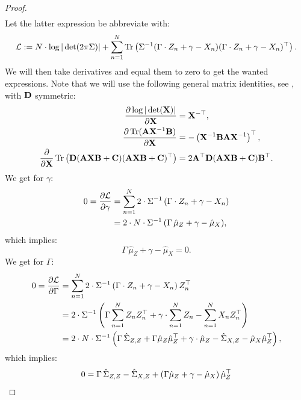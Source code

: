 \begin{Lem}
\begin{proof}
\begin{align*}
    \end{align*}
Let the latter expression be abbreviate with:
\[\mathcal{L}  :=N \cdot \log |\det(2\pi\Sigma)| + \sum_{n=1}^N \operatorname{Tr}\left ( \Sigma^{-1}(\Gamma \cdot Z_n + \gamma - X_n)(\Gamma \cdot Z_n + \gamma - X_n)^\top \right ).\]
    We will then take derivatives and equal them to zero to get the wanted expressions. 
Note that we will use the following general matrix identities, see \cite{matrixcookbook}, with $\mathbf{D}$ symmetric:
\begin{align*}
    \frac{\partial \log | \det(\mathbf{X})|}{\partial \mathbf{X}} &= \mathbf{X}^{-\top},\\
    \frac{\partial \operatorname{Tr}(\mathbf{A} \mathbf{X}^{-1} \mathbf{B}) }{ \partial \mathbf{X} } &= - \left ( \mathbf{X}^{-1} \mathbf{B} \mathbf{A} \mathbf{X}^{-1} \right )^\top,\\
    \frac{\partial}{\partial \mathbf{X}} \operatorname{Tr} \left ( \mathbf{D} (\mathbf{A}\mathbf{X}\mathbf{B}+\mathbf{C})(\mathbf{A}\mathbf{X}\mathbf{B}+\mathbf{C})^\top\right ) 
    &= 2 \mathbf{A}^\top \mathbf{D} (\mathbf{A} \mathbf{X} \mathbf{B} + \mathbf{C}) \mathbf{B}^\top.
\end{align*}
We get for $\gamma$:
\begin{align*}
 0 = \frac{\partial \mathcal{L}}{\partial \gamma} & = \sum_{n=1}^N  2 \cdot \Sigma^{-1}\,(\Gamma \cdot Z_n + \gamma - X_n) \\
 &= 2 \cdot N \cdot \Sigma^{-1} \, ( \Gamma\, \hat \mu_Z + \gamma - \hat \mu_X), 
 \end{align*}
 which implies:
 \[ \Gamma\, \hat \mu_Z + \gamma - \hat \mu_X = 0.  \]
We get for $\Gamma$:
\begin{align*}
 0 = \frac{\partial \mathcal{L}}{\partial \Gamma} & = \sum_{n=1}^N  2 \cdot \Sigma^{-1}\,(\Gamma \cdot Z_n + \gamma - X_n)\, Z_n^\top \\
 &= 2 \cdot \Sigma^{-1} \left ( \Gamma \sum_{n=1}^N Z_n Z_n^\top + \gamma \cdot \sum_{n=1}^N Z_n - \sum_{n=1}^N X_n Z_n^\top    \right )\\ 
 &= 2 \cdot N \cdot \Sigma^{-1} \left ( \Gamma\, \hat \Sigma_{Z,Z} + \Gamma \hat\mu_Z \hat \mu_Z^\top + \gamma \cdot \hat \mu_Z - 
  \hat \Sigma_{X,Z} - \hat \mu_X \hat \mu_Z^\top \right ), 
 \end{align*}
 which implies:
 \begin{align*}
     0 &= \Gamma\, \hat \Sigma_{Z,Z} - \hat \Sigma_{X,Z} + \lp \Gamma \hat\mu_Z  + \gamma - \hat \mu_X \rp \hat \mu_Z^\top \\

\end{align*}
\end{proof}
\end{Lem}

